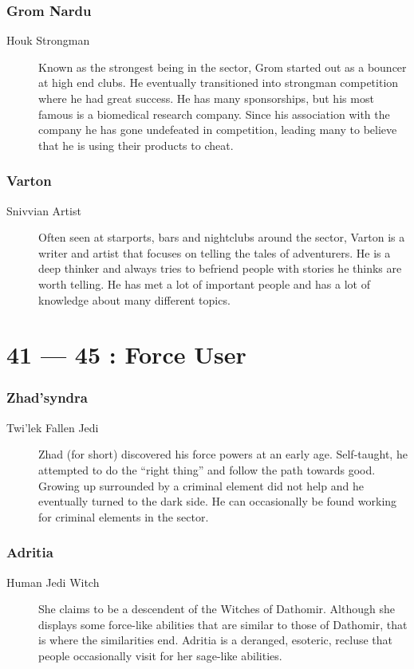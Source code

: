 \documentclass{article}
\begin{document}
\section{Grom Nardu}
\begin{description}
	\item [Houk \male Strongman] Known as the strongest being in the sector, Grom started out as a bouncer at high end clubs. He eventually transitioned into strongman competition where he had great success. He has many sponsorships, but his most famous is a biomedical research company. Since his association with the company he has gone undefeated in competition, leading many to believe that he is using their products to cheat.
\end{description}
\section{Varton}
\begin{description}
	\item [Snivvian \male Artist] Often seen at starports, bars and nightclubs around the sector, Varton is a writer and artist that focuses on telling the tales of adventurers. He is a deep thinker and always tries to befriend people with stories he thinks are worth telling. He has met a lot of important people and has a lot of knowledge about many different topics.
\end{description}

\part*{41 --- 45 : Force User}
\setcounter{section}{40}
\section{Zhad’syndra}
\begin{description}
	\item [Twi’lek \male Fallen Jedi] Zhad (for short) discovered his force powers at an early age. Self-taught, he attempted to do the “right thing” and follow the path towards good. Growing up surrounded by a criminal element did not help and he eventually turned to the dark side. He can occasionally be found working for criminal elements in the sector.
\end{description}
\section{Adritia}
\begin{description}
	\item [Human \female Jedi Witch] She claims to be a descendent of the Witches of Dathomir. Although she displays some force-like abilities that are similar to those of Dathomir, that is where the similarities end. Adritia is a deranged, esoteric, recluse that people occasionally visit for her sage-like abilities.
\end{description}
\end{document}
